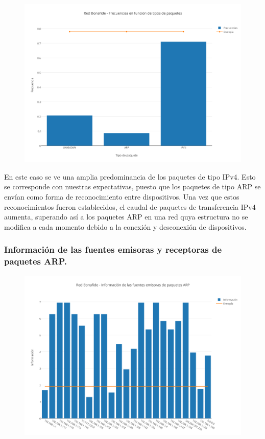 \begin{figure}[h!]
    \centering                                                       
    \includegraphics[width=400pt]{img/BonafideFrecuenciaVsTipoPaquetes}
    \caption{}
    \label{bonafidePaquetes}
\end{figure}

En este caso se ve una amplia predominancia de los paquetes de tipo IPv4. Esto se corresponde con nuestras expectativas, puesto que los paquetes de tipo ARP se envían como forma de reconocimiento entre dispositivos. Una vez que estos reconocimientos fueron establecidos, el caudal de paquetes de transferencia IPv4 aumenta, superando así a los paquetes ARP en una red quya estructura no se modifica a cada momento debido a la conexión y desconexión de dispositivos.

\subsubsection{Informaci\'on de las fuentes emisoras y receptoras de paquetes ARP.}

\begin{figure}[h!]
    \centering                                                       
    \includegraphics[width=400pt]{img/RedBonafideFuentesEmisorasARP}
    \caption{}
    \label{bonafideEmisoras}
\end{figure}

